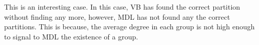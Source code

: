
This is an interesting case. In this case, VB has found the correct
partition without finding any more, however, MDL has not found any
the correct partitions. This is because, the average degree in each
group is not high enough to signal to MDL the existence of a group.
